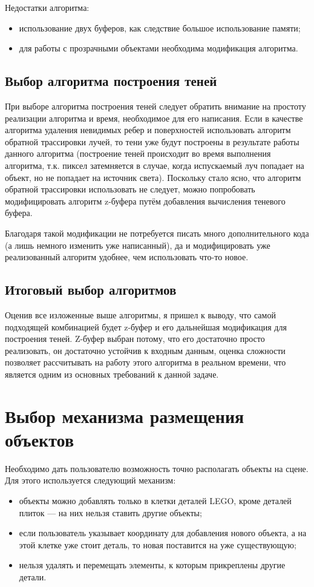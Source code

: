Недостатки алгоритма:
\begin{itemize}[label=---]
    \item использование двух буферов, как следствие большое использование памяти;
    \item для работы с прозрачными объектами необходима модификация алгоритма.
\end{itemize}

\subsection{Выбор алгоритма построения теней}

При выборе алгоритма построения теней следует обратить внимание на простоту реализации алгоритма и время, необходимое для его написания. Если в качестве алгоритма удаления невидимых ребер и поверхностей использовать алгоритм обратной трассировки лучей, то тени уже будут построены в результате работы данного алгоритма (построение теней происходит во время выполнения алгоритма, т.к. пиксел затемняется в случае, когда испускаемый луч попадает на объект, но не попадает на источник света). Поскольку стало ясно, что алгоритм обратной трассировки использовать не следует, можно попробовать модифицировать алгоритм z-буфера путём добавления вычисления теневого буфера.

Благодаря такой модификации не потребуется писать много дополнительного кода (а лишь немного изменить уже написанный), да и модифицировать уже реализованный алгоритм удобнее, чем использовать что-то новое.

\subsection{Итоговый выбор алгоритмов}

Оценив все изложенные выше алгоритмы, я пришел к выводу, что самой подходящей комбинацией будет z-буфер и его дальнейшая модификация для построения теней. Z-буфер выбран потому, что его достаточно просто реализовать, он достаточно устойчив к входным данным, оценка сложности позволяет рассчитывать на работу этого алгоритма в реальном времени, что является одним из основных требований к данной задаче.

\section{Выбор механизма размещения объектов}

Необходимо дать пользователю возможность точно располагать объекты на сцене. Для этого используется следующий механизм:
\begin{itemize}[label=---]
    \item объекты можно добавлять только в клетки деталей LEGO, кроме деталей плиток --- на них нельзя ставить другие объекты;
    \item если пользователь указывает координату для добавления нового объекта, а на этой клетке уже стоит деталь, то новая поставится на уже существующую;
    \item нельзя удалять и перемещать элементы, к которым прикреплены другие детали.
\end{itemize}

